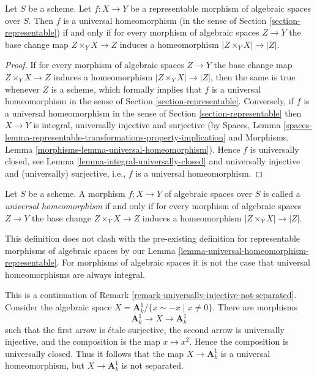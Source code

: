 \begin{lemma}
\label{lemma-universal-homeomorphism-representable}
Let $S$ be a scheme.
Let $f : X \to Y$ be a representable morphism of algebraic spaces over $S$.
Then $f$ is a universal homeomorphism
(in the sense of Section \ref{section-representable}) if and only
if for every morphism of algebraic spaces $Z \to Y$ the base change
map $Z \times_Y X \to Z$ induces a homeomorphism
$|Z \times_Y X| \to |Z|$.
\end{lemma}

\begin{proof}
If for every morphism of algebraic spaces $Z \to Y$ the base change
map $Z \times_Y X \to Z$ induces a homeomorphism
$|Z \times_Y X| \to |Z|$, then the same is true whenever $Z$ is a scheme,
which formally implies that $f$ is a universal homeomorphism in the
sense of
Section \ref{section-representable}.
Conversely, if $f$ is a universal homeomorphism in the sense of
Section \ref{section-representable}
then $X \to Y$ is integral, universally injective and surjective
(by Spaces, Lemma
\ref{spaces-lemma-representable-transformations-property-implication}
and
Morphisms, Lemma \ref{morphisms-lemma-universal-homeomorphism}).
Hence $f$ is universally closed, see
Lemma \ref{lemma-integral-universally-closed}
and universally injective and (universally) surjective, i.e.,
$f$ is a universal homeomorphism.
\end{proof}

\begin{definition}
\label{definition-universal-homeomorphism}
Let $S$ be a scheme.
A morphism $f : X \to Y$ of algebraic spaces over $S$
is called a {\it universal homeomorphism}
if and only if for every morphism of algebraic spaces $Z \to Y$
the base change $Z \times_Y X \to Z$ induces a homeomorphism
$|Z \times_Y X| \to |Z|$.
\end{definition}

\noindent
This definition does not clash with the pre-existing definition for
representable morphisms of algebraic spaces by our
Lemma \ref{lemma-universal-homeomorphism-representable}.
For morphisms of algebraic spaces it is not the case that universal
homeomorphisms are always integral.

\begin{example}
\label{example-universal-homeomorphism}
This is a continuation of
Remark \ref{remark-universally-injective-not-separated}.
Consider the algebraic space
$X = \mathbf{A}^1_k/\{x \sim -x \mid x \not = 0\}$.
There are morphisms
$$
\mathbf{A}^1_k \longrightarrow X \longrightarrow \mathbf{A}^1_k
$$
such that the first arrow is \'etale surjective, the second arrow is
universally injective, and the composition is the map $x \mapsto x^2$.
Hence the composition is universally closed. Thus it follows that the
map $X \to \mathbf{A}^1_k$ is a universal homeomorphism, but
$X \to \mathbf{A}^1_k$ is not separated.
\end{example}

